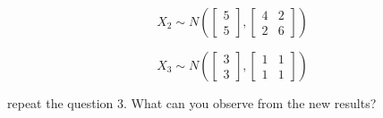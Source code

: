 \begin{enumerate}
    \begin{equation*}
        X_2 \sim N\left( \begin{bmatrix} 5 \\ 5 \end{bmatrix}, \begin{bmatrix} 4 & 2 \\ 2 & 6 \end{bmatrix} \right)
    \end{equation*}
    
    \begin{equation*}
        X_3 \sim N\left( \begin{bmatrix} 3 \\ 3 \end{bmatrix}, \begin{bmatrix} 1 & 1 \\ 1 & 1 \end{bmatrix} \right)
    \end{equation*}
    
    \noindent repeat the question 3. What can you observe from the new results?
    
\end{enumerate}

    





